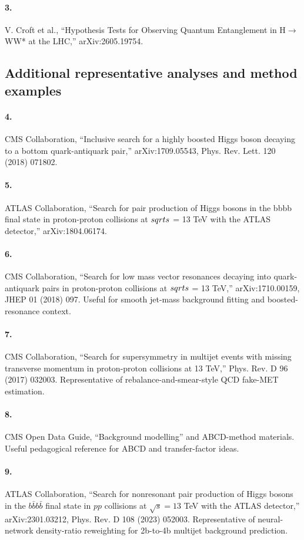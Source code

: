 \documentclass[11pt]{article}
\begin{document}
\paragraph{3.} V. Croft et al., ``Hypothesis Tests for Observing Quantum Entanglement in H$\to$WW* at the LHC,'' arXiv:2605.19754.

\subsection{Additional representative analyses and method examples}

\paragraph{4.} CMS Collaboration, ``Inclusive search for a highly boosted Higgs boson decaying to a bottom quark-antiquark pair,'' arXiv:1709.05543, Phys. Rev. Lett. 120 (2018) 071802.
\paragraph{5.} ATLAS Collaboration, ``Search for pair production of Higgs bosons in the bbbb final state in proton-proton collisions at $\\sqrt{s}$ = 13 TeV with the ATLAS detector,'' arXiv:1804.06174.
\paragraph{6.} CMS Collaboration, ``Search for low mass vector resonances decaying into quark-antiquark pairs in proton-proton collisions at $\\sqrt{s}$ = 13 TeV,'' arXiv:1710.00159, JHEP 01 (2018) 097. Useful for smooth jet-mass background fitting and boosted-resonance context.
\paragraph{7.} CMS Collaboration, ``Search for supersymmetry in multijet events with missing transverse momentum in proton-proton collisions at 13 TeV,'' Phys. Rev. D 96 (2017) 032003. Representative of rebalance-and-smear-style QCD fake-MET estimation.
\paragraph{8.} CMS Open Data Guide, ``Background modelling'' and ABCD-method materials. Useful pedagogical reference for ABCD and transfer-factor ideas.
\paragraph{9.} ATLAS Collaboration, ``Search for nonresonant pair production of Higgs bosons in the $b\bar b b\bar b$ final state in $pp$ collisions at $\sqrt{s}=13$ TeV with the ATLAS detector,'' arXiv:2301.03212, Phys. Rev. D 108 (2023) 052003. Representative of neural-network density-ratio reweighting for 2b-to-4b multijet background prediction.
\end{document}
